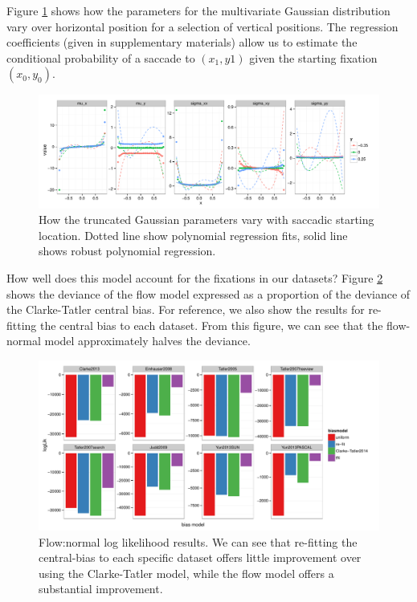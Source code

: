 Figure \ref{fig:nParamsOverSpace} shows how the parameters for the multivariate Gaussian distribution vary over horizontal position for a selection of vertical positions. The regression coefficients (given in supplementary materials) allow us to estimate the conditional probability of a saccade to $(x_1, y1)$ given the starting fixation $(x_0, y_0)$.

\begin{figure}
\centering
\includegraphics[width=16cm]{../scripts/flow/figs/NparamsChagingOverSpace_ALL_tN}
\caption{How the truncated Gaussian parameters vary with saccadic starting location. Dotted line show polynomial regression fits, solid line shows robust polynomial regression.}
\label{fig:nParamsOverSpace}
\end{figure}


How well does this model account for the fixations in our datasets? Figure \ref{fig:nFlowDevAll} shows the deviance of the flow model expressed as a proportion of the deviance of the Clarke-Tatler central bias. For reference, we also show the results for re-fitting the central bias to each dataset. From this figure, we can see that the flow-normal model approximately halves the deviance. 

\begin{figure}
\centering
 \includegraphics[width=12cm]{../scripts/flow/figs/llh_training.pdf}
\caption{Flow:normal log likelihood results. We can see that re-fitting the central-bias to each specific dataset offers little improvement over using the Clarke-Tatler model, while the flow model offers a substantial improvement.}
\label{fig:nFlowDevAll}
\end{figure}


